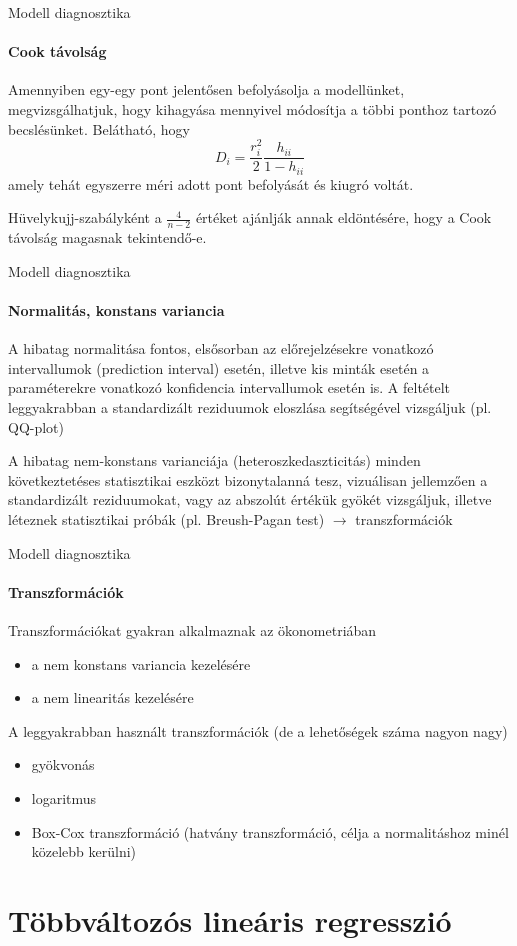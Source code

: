 \documentclass[10pt]{beamer}
\begin{document}
\begin{frame}{Modell diagnosztika}
\framesubtitle{Cook távolság}
Amennyiben egy-egy pont jelentősen befolyásolja a modellünket, megvizsgálhatjuk, hogy kihagyása mennyivel módosítja a többi ponthoz tartozó becslésünket. Belátható, hogy
\[
D_i = \dfrac{r_i^2}{2}\dfrac{h_{ii}}{1-h_{ii}}
\]
amely tehát egyszerre méri adott pont befolyását és kiugró voltát.

Hüvelykujj-szabályként a $\frac{4}{n-2}$ értéket ajánlják annak eldöntésére, hogy a Cook távolság magasnak tekintendő-e.
\end{frame}

\begin{frame}{Modell diagnosztika}
\framesubtitle{Normalitás, konstans variancia}
A hibatag normalitása fontos, elsősorban az előrejelzésekre vonatkozó intervallumok (prediction interval) esetén, illetve kis minták esetén a paraméterekre vonatkozó konfidencia intervallumok esetén is. A feltételt leggyakrabban a standardizált reziduumok eloszlása segítségével vizsgáljuk (pl. QQ-plot)

A hibatag nem-konstans varianciája (heteroszkedaszticitás) minden következtetéses statisztikai eszközt bizonytalanná tesz, vizuálisan jellemzően a standardizált reziduumokat, vagy az abszolút értékük gyökét vizsgáljuk, illetve léteznek statisztikai próbák (pl. Breush-Pagan test) $\to$ transzformációk
\end{frame}

\begin{frame}{Modell diagnosztika}
\framesubtitle{Transzformációk}
Transzformációkat gyakran alkalmaznak az ökonometriában
\begin{itemize}
\item a nem konstans variancia kezelésére
\item a nem linearitás kezelésére
\end{itemize}
A leggyakrabban használt transzformációk (de a lehetőségek száma nagyon nagy)
\begin{itemize}
\item gyökvonás
\item logaritmus
\item Box-Cox transzformáció (hatvány transzformáció, célja a normalitáshoz minél közelebb kerülni)
\end{itemize}
\end{frame}

\section{Többváltozós lineáris regresszió}
\end{document}
